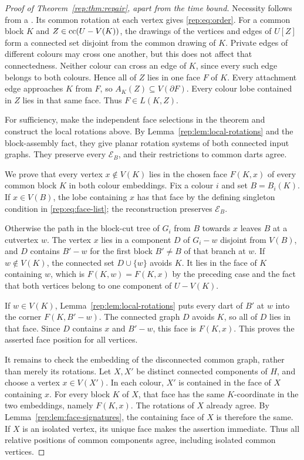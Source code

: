 \begin{proof}[Proof of Theorem~\ref{rep:thm:repair}, apart from the time bound]
Necessity follows from a \SEFE{}.  Its common rotation at each vertex gives
\eqref{rep:eq:order}.  For a common block $K$ and
$Z\in\operatorname{cc}(U-V(K))$, the drawings of the vertices and edges of $U[Z]$ form a
connected set disjoint from the common drawing of $K$.  Private edges of
different colours may cross one another, but this does not affect that
connectedness.  Neither colour can cross an edge of $K$, since every such
edge belongs to both colours.  Hence all of $Z$ lies in one face $F$ of $K$.
Every attachment edge approaches $K$ from $F$, so
$A_K(Z)\subseteq V(\partial F)$.  Every colour lobe contained in $Z$ lies
in that same face.  Thus $F\in L(K,Z)$.

For sufficiency, make the independent face selections in the theorem and
construct the local rotations above.  By
Lemma~\ref{rep:lem:local-rotations} and the block-assembly fact, they give
planar rotation systems of both connected input graphs.  They preserve
every $\mathcal E_B$, and their restrictions to common darts agree.

We prove that every vertex $x\notin V(K)$ lies in the chosen face
$F(K,x)$ of every common block $K$ in both colour embeddings.  Fix a
colour $i$ and set $B=B_i(K)$.  If $x\in V(B)$, the lobe containing $x$
has that face by the defining singleton condition in
\eqref{rep:eq:face-list}; the reconstruction preserves $\mathcal E_B$.

Otherwise the path in the block-cut tree of $G_i$ from $B$ towards $x$
leaves $B$ at a cutvertex $w$.  The vertex $x$ lies in a component $D$ of
$G_i-w$ disjoint from $V(B)$, and $D$ contains $B'-w$ for the first block
$B'\ne B$ of that branch at $w$.  If $w\notin V(K)$, the connected set
$D\cup\{w\}$ avoids $K$.  It lies in the face of $K$ containing $w$,
which is $F(K,w)=F(K,x)$ by the preceding case and the fact that both
vertices belong to one component of $U-V(K)$.

If $w\in V(K)$, Lemma~\ref{rep:lem:local-rotations} puts every dart of
$B'$ at $w$ into the corner $F(K,B'-w)$.  The connected graph $D$ avoids
$K$, so all of $D$ lies in that face.  Since $D$ contains $x$ and $B'-w$,
this face is $F(K,x)$.  This proves the asserted face position for all
vertices.

It remains to check the embedding of the disconnected common graph,
rather than merely its rotations.  Let $X,X'$ be distinct connected
components of $H$, and choose a vertex $x\in V(X')$.  In each colour,
$X'$ is contained in the face of $X$ containing $x$.  For every block $K$
of $X$, that face has the same $K$-coordinate in the two embeddings, namely
$F(K,x)$.  The rotations of $X$ already agree.  By
Lemma~\ref{rep:lem:face-signatures}, the containing face of $X$ is therefore
the same.  If $X$ is an isolated vertex, its unique face makes the assertion
immediate.  Thus all relative positions of common components agree,
including isolated common vertices.


\end{proof}
